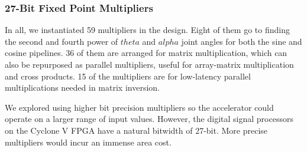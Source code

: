 \subsubsection{27-Bit Fixed Point Multipliers}
In all, we instantiated 59 multipliers in the design. Eight of them go to finding the second and fourth power of $theta$ and $alpha$ joint angles for both the sine and cosine pipelines. 36 of them are arranged for matrix multiplication, which can also be repurposed as parallel multipliers, useful for array-matrix multiplication and cross products. 15 of the multipliers are for low-latency parallel multiplications needed in matrix inversion.

We explored using higher bit precision multipliers so the accelerator could operate on a larger range of input values. However, the digital signal processors on the Cyclone V FPGA have a natural bitwidth of 27-bit. More precise multipliers would incur an immense area cost.